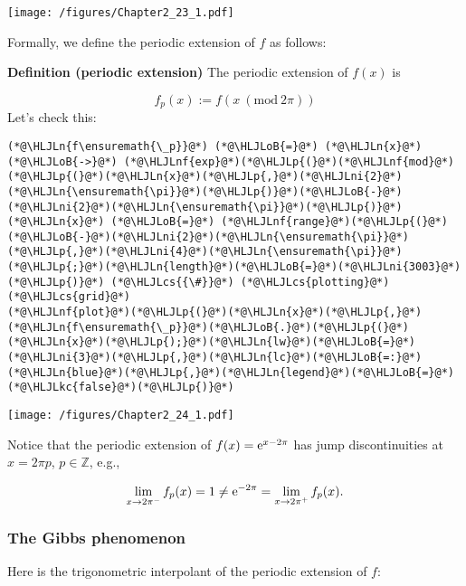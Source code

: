 \documentclass[12pt,a4paper]{article}
\newcommand{\HLJLkc}[1]{\textcolor[RGB]{59,151,46}{\textit{#1}}}
\newcommand{\HLJLn}[1]{#1}
\newcommand{\HLJLnf}[1]{\textcolor[RGB]{66,102,213}{#1}}
\newcommand{\HLJLni}[1]{\textcolor[RGB]{59,151,46}{#1}}
\newcommand{\HLJLoB}[1]{\textcolor[RGB]{102,102,102}{\textbf{#1}}}
\newcommand{\HLJLp}[1]{#1}
\newcommand{\HLJLcs}[1]{\textcolor[RGB]{153,153,119}{\textit{#1}}}
\begin{document}
\texttt{[image: /figures/Chapter2\_23\_1.pdf]}

Formally, we define the periodic extension of $f$ as follows:

\textbf{Definition (periodic extension)} The periodic extension of $f(x)$ is

\[
f_p(x) :=  f(x \: (\mathrm{mod}\: 2\pi))
\]
Let's check this:


\begin{lstlisting}
(*@\HLJLn{f\ensuremath{\_p}}@*) (*@\HLJLoB{=}@*) (*@\HLJLn{x}@*) (*@\HLJLoB{->}@*) (*@\HLJLnf{exp}@*)(*@\HLJLp{(}@*)(*@\HLJLnf{mod}@*)(*@\HLJLp{(}@*)(*@\HLJLn{x}@*)(*@\HLJLp{,}@*)(*@\HLJLni{2}@*)(*@\HLJLn{\ensuremath{\pi}}@*)(*@\HLJLp{)}@*)(*@\HLJLoB{-}@*)(*@\HLJLni{2}@*)(*@\HLJLn{\ensuremath{\pi}}@*)(*@\HLJLp{)}@*)
(*@\HLJLn{x}@*) (*@\HLJLoB{=}@*) (*@\HLJLnf{range}@*)(*@\HLJLp{(}@*)(*@\HLJLoB{-}@*)(*@\HLJLni{2}@*)(*@\HLJLn{\ensuremath{\pi}}@*)(*@\HLJLp{,}@*)(*@\HLJLni{4}@*)(*@\HLJLn{\ensuremath{\pi}}@*)(*@\HLJLp{;}@*)(*@\HLJLn{length}@*)(*@\HLJLoB{=}@*)(*@\HLJLni{3003}@*)(*@\HLJLp{)}@*) (*@\HLJLcs{{\#}}@*) (*@\HLJLcs{plotting}@*) (*@\HLJLcs{grid}@*)
(*@\HLJLnf{plot}@*)(*@\HLJLp{(}@*)(*@\HLJLn{x}@*)(*@\HLJLp{,}@*)(*@\HLJLn{f\ensuremath{\_p}}@*)(*@\HLJLoB{.}@*)(*@\HLJLp{(}@*)(*@\HLJLn{x}@*)(*@\HLJLp{);}@*)(*@\HLJLn{lw}@*)(*@\HLJLoB{=}@*)(*@\HLJLni{3}@*)(*@\HLJLp{,}@*)(*@\HLJLn{lc}@*)(*@\HLJLoB{=:}@*)(*@\HLJLn{blue}@*)(*@\HLJLp{,}@*)(*@\HLJLn{legend}@*)(*@\HLJLoB{=}@*)(*@\HLJLkc{false}@*)(*@\HLJLp{)}@*)
\end{lstlisting}

\texttt{[image: /figures/Chapter2\_24\_1.pdf]}

Notice that the periodic extension of $f(x) = {\rm e}^{x-2\pi}$ has jump discontinuities at $x = 2\pi p$, $p \in \mathbb{Z}$, e.g., 

\[
\lim_{x \to 2\pi^{-}} f_p(x) = 1 \neq {\rm e}^{-2\pi} = \lim_{x \to 2\pi^{+}} f_p(x).
\]
\subsubsection{The Gibbs phenomenon}
Here is the trigonometric interpolant of the periodic extension of $f$:
\end{document}
